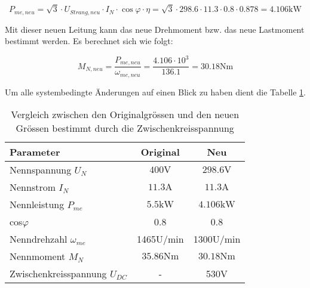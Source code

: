 \begin{equation}\label{equ:Leistung_Welle_neu}
P _{me,neu} = \sqrt{3}\cdot U_{Strang,neu}\cdot I_{N}\cdot \cos \varphi \cdot \eta = \sqrt{3}\cdot 298.6\cdot 11.3\cdot 0.8 \cdot 0.878 = 4.106 \mathrm{kW}
\end{equation}

Mit dieser neuen Leitung kann das neue Drehmoment bzw. das neue Lastmoment bestimmt werden. Es berechnet sich wie folgt:

\begin{equation}\label{equ:Lastmoment_neu}
M_{N,neu} = \frac{P_{me,neu}}{\omega _{me,neu}} = \frac{4.106\cdot 10^{3}}{136.1} = 30.18 \mathrm{Nm}
\end{equation}

Um alle systembedingte Änderungen auf einen Blick zu haben dient die Tabelle \ref{tab:Vergleich_Grenzen}.

\renewcommand{\arraystretch}{1.5}
\begin{table}[h]
	\centering
	\begin{tabular}{|l|c|c|}
		\hline
		\textbf{Parameter} & \textbf{Original} & \textbf{Neu} \\ \hline
		Nennspannung $U_{N}$  & $400\mathrm{V}$ & $298.6\mathrm{V}$ \\ \hline
		Nennstrom $I_{N}$ & $11.3\mathrm{A} $ & $11.3\mathrm{A} $ \\ \hline 
		Nennleistung $P_{me}$ & $5.5\mathrm{kW}$ & $4.106\mathrm{kW}$\\ \hline 
		cos$\varphi$ & 0.8 & 0.8 \\ \hline
		Nenndrehzahl $\omega_{me}$ & 1465U/min & 1300U/min \\ \hline
		Nennmoment $M_{N}$ & $35.86\mathrm{Nm}$ & $30.18\mathrm{Nm}$ \\ \hline
		Zwischenkreisspannung $U_{DC}$ & - & 530V \\ \hline
	\end{tabular} 	
	\caption{Vergleich zwischen den Originalgrössen und den neuen Grössen bestimmt durch die Zwischenkreisspannung}
	\label{tab:Vergleich_Grenzen}
\end{table}
 
\renewcommand{\arraystretch}{1}
 



